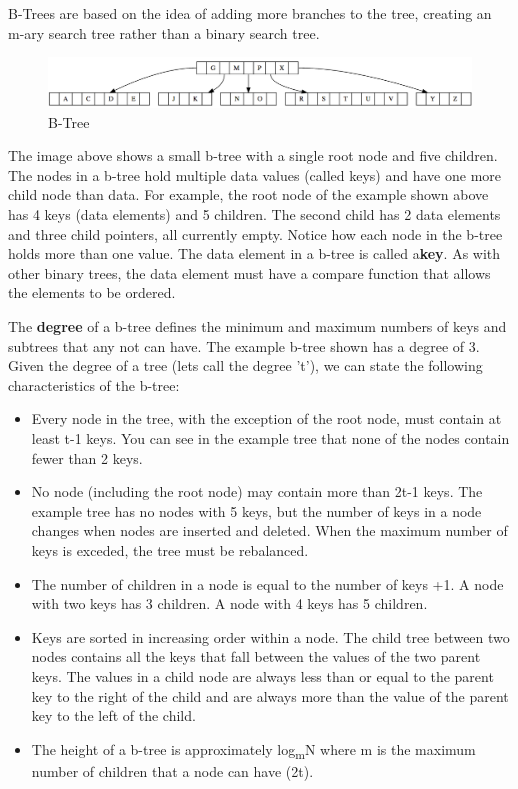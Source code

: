B-Trees are based on the idea of adding more branches to the tree, creating an m-ary search tree rather than a binary search tree.

\begin{figure}[H]
\centering
\includegraphics[width=\textwidth]{pictures/btree1.png}
\caption{B-Tree}
\label{fig:tree23}
\end{figure}

The image above shows a small b-tree with a single root node and five children. The nodes in a b-tree hold multiple data values (called keys) and have one more child node than data.   For example, the root node of the example shown above has 4 keys (data elements) and 5 children. The second child has 2 data elements and three child pointers, all currently empty.    Notice how each node in the b-tree holds more than one value.   The data element in a b-tree is called a\textbf{key}.   As with other binary trees, the data element must have a compare function that allows the elements to be ordered.

The \textbf{degree} of a b-tree defines the minimum and maximum numbers of keys and subtrees that any not can have.    The example b-tree shown has a degree of 3.   Given the degree of a tree (lets call the degree 't'),  we can state the following characteristics of the b-tree:
\begin{itemize}
\item Every node in the tree, with the exception of the root node,  must contain at least t-1 keys.   You can see in the example tree that none of the nodes contain fewer than 2 keys.
\item No node (including the root node) may contain more than 2t-1 keys.   The example tree has no nodes with 5 keys, but the number of keys in a node changes when nodes are inserted and deleted.  When the maximum number of keys is exceded, the tree must be rebalanced.
\item The number of children in a node is equal to the number of keys +1.  A node with two keys has 3 children.  A node with 4 keys has 5 children.
\item Keys are sorted in increasing order within a node.   The child tree between two nodes contains all the keys that fall between the values of the two parent keys.   The values in a child node are always less than or equal to the parent key to the right of the child and are always more than the value of the parent key to the left of the child.
\item The height of a b-tree is approximately log\textsubscript{m}N where m is the maximum number of children that a node can have (2t).
\end{itemize}


